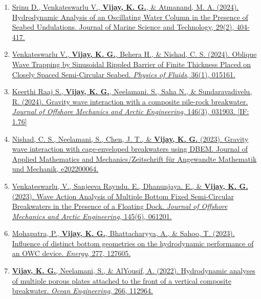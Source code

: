 \begin{enumerate}[label=\protect\circled{\arabic*}]
\item \href{https://doi.org/10.1007/s00773-024-00994-5}{%
Srinu D., Venkateswarlu V., \textbf{Vijay, K. G.}, \& Atmanand, M. A. (2024). Hydrodynamic Analysis of an Oscillating Water Column in the Presence of Seabed Undulations. Journal of Marine Science and Technology, 29(2), 404-417.}

\item \href{https://doi.org/10.1063/5.0179239}{%
Venkateswarlu V., \textbf{Vijay, K. G.}, Behera H., \& Nishad, C. S. (2024). Oblique Wave Trapping by Sinusoidal Rippled Barrier of Finite Thickness Placed on Closely Spaced Semi-Circular Seabed. \textit{Physics of Fluids}, 36(1), 015161.}
 
\item \href{https://doi.org/10.1115/1.4064013}{%
Keerthi Raaj S., \textbf{Vijay, K. G.}, Neelamani. S., Saha N., \&  Sundaravadivelu, R. (2024). Gravity wave interaction with a composite pile-rock breakwater. \textit{Journal of Offshore Mechanics and Arctic Engineering}, 146(3), 031903. [IF: 1.76]}

\item \href{https://doi.org/10.1002/zamm.202200064}{%
Nishad, C. S., Neelamani, S., Chen, J. T., \& \textbf{Vijay, K. G.} (2023). Gravity wave interaction with cage-enveloped breakwaters using DBEM. Journal of Applied Mathematics and Mechanics/Zeitschrift für Angewandte Mathematik und Mechanik, e202200064.}
 
\item \href{https://doi.org/10.1115/1.4062114}{%
Venkateswarlu, V., Sanjeeva Rayudu. E., Dhanunjaya. E., \& \textbf{Vijay, K. G.} (2023). Wave Action Analysis of Multiple Bottom Fixed Semi-Circular Breakwaters in the Presence of a Floating Dock. \textit{Journal of Offshore Mechanics and Arctic Engineering}, 145(6), 061201.}  

\item \href{https://doi.org/10.1016/j.energy.2023.127605}{%
Mohapatra, P., \textbf{Vijay, K. G.}, Bhattacharyya, A., \& Sahoo, T. (2023). Influence of distinct bottom geometries on the hydrodynamic performance of an OWC device.  \textit{Energy}, 277, 127605.}

\item \href{https://doi.org/10.1016/j.oceaneng.2022.112964}{%
\textbf{Vijay, K. G.}, Neelamani, S., \& AlYousif, A. (2022). Hydrodynamic analyses of multiple porous plates attached to the front of a vertical composite breakwater.  \textit{Ocean Engineering}, 266, 112964.}


\end{enumerate}

